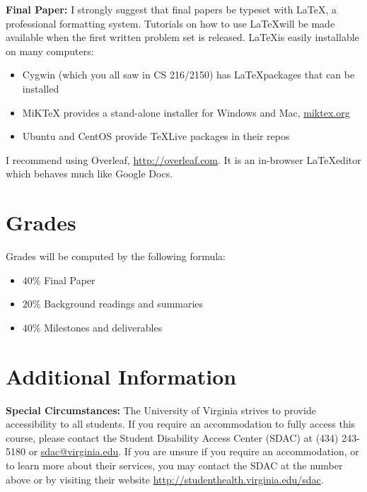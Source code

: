 \documentclass[12pt]{article}
\begin{document}
   \newpage




\textbf{Final Paper:} I strongly suggest that final papers be typeset with \LaTeX, a professional formatting system. Tutorials on how to use \LaTeX will be made available when the first written problem set is released. \LaTeX is easily installable on many computers: 
\begin{itemize}
    \item Cygwin (which you all saw in CS 216/2150) has \LaTeX packages that can be installed
    \item MiKTeX provides a stand-alone installer for Windows and Mac, \url{miktex.org}
    \item Ubuntu and CentOS provide TeXLive packages in their repos
\end{itemize}
I recommend using Overleaf, \url{http://overleaf.com}. It is an in-browser \LaTeX editor which behaves much like Google Docs. 

\section*{Grades}

Grades will be computed by the following formula:
\begin{itemize}
    \item $40\%$ Final Paper
    \item $20\%$ Background readings and summaries
    \item $40\%$ Milestones and deliverables
\end{itemize}

\section*{Additional Information}

\textbf{Special Circumstances:} The University of Virginia strives to provide accessibility to all students. If you require an accommodation to fully access this course, please contact the Student Disability Access Center (SDAC) at (434) 243-5180 or \url{sdac@virginia.edu}. If you are unsure if you require an accommodation, or to learn more about their services, you may contact the SDAC at the number above or by visiting their website \url{http://studenthealth.virginia.edu/sdac}.
\end{document}
